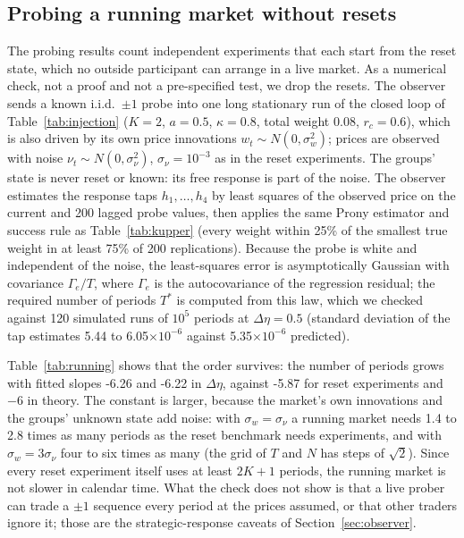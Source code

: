 \documentclass[12pt]{article}
\theoremstyle{definition}
\theoremstyle{remark}
\begin{document}
\subsection{Probing a running market without resets}\label{app:running}
The probing results count independent experiments that each start from the reset state, which no outside participant can arrange in a live market. As a numerical check, not a proof and not a pre-specified test, we drop the resets. The observer sends a known i.i.d.\ $\pm1$ probe into one long stationary run of the closed loop of Table~\ref{tab:injection} ($K=2$, $a=0.5$, $\kappa=0.8$, total weight $0.08$, $r_c=0.6$), which is also driven by its own price innovations $w_t\sim N(0,\sigma_w^2)$; prices are observed with noise $\nu_t\sim N(0,\sigma_\nu^2)$, $\sigma_\nu=10^{-3}$ as in the reset experiments. The groups' state is never reset or known: its free response is part of the noise. The observer estimates the response taps $h_1,\ldots,h_4$ by least squares of the observed price on the current and 200 lagged probe values, then applies the same Prony estimator and success rule as Table~\ref{tab:kupper} (every weight within 25\% of the smallest true weight in at least 75\% of 200 replications). Because the probe is white and independent of the noise, the least-squares error is asymptotically Gaussian with covariance $\Gamma_e/T$, where $\Gamma_e$ is the autocovariance of the regression residual; the required number of periods $T^*$ is computed from this law, which we checked against 120 simulated runs of $10^5$ periods at $\Delta\eta=0.5$ (standard deviation of the tap estimates 5.44 to 6.05$\times10^{-6}$ against 5.35$\times10^{-6}$ predicted).

Table~\ref{tab:running} shows that the order survives: the number of periods grows with fitted slopes -6.26 and -6.22 in $\Delta\eta$, against -5.87 for reset experiments and $-6$ in theory. The constant is larger, because the market's own innovations and the groups' unknown state add noise: with $\sigma_w=\sigma_\nu$ a running market needs 1.4 to 2.8 times as many periods as the reset benchmark needs experiments, and with $\sigma_w=3\sigma_\nu$ four to six times as many (the grid of $T$ and $N$ has steps of $\sqrt2$). Since every reset experiment itself uses at least $2K+1$ periods, the running market is not slower in calendar time. What the check does not show is that a live prober can trade a $\pm1$ sequence every period at the prices assumed, or that other traders ignore it; those are the strategic-response caveats of Section~\ref{sec:observer}.
\end{document}
